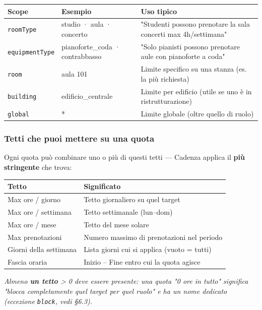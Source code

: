 \documentclass[11pt,a4paper]{article}
\renewenvironment{quote}
  {\begin{list}{}{%
      \setlength{\leftmargin}{8pt}%
      \setlength{\rightmargin}{8pt}%
      \setlength{\topsep}{6pt}%
      \setlength{\parsep}{0pt}}%
      \item\relax\color{black!75}\itshape}
  {\end{list}}
\begin{document}
\begin{table}[H]
\centering
\small
\begin{tabularx}{\linewidth}{|X|X|X|}
\hline
\rowcolor{tableheader} Scope & Esempio & Uso tipico \\
\hline
\texttt{roomType} & studio · aula · concerto & "Studenti possono prenotare la sala concerti max 4h/settimana" \\
\hline
\texttt{equipmentType} & pianoforte\_coda · contrabbasso & "Solo pianisti possono prenotare aule con pianoforte a coda" \\
\hline
\texttt{room} & aula 101 & Limite specifico su una stanza (es. la più richiesta) \\
\hline
\texttt{building} & edificio\_centrale & Limite per edificio (utile se uno è in ristrutturazione) \\
\hline
\texttt{global} & * & Limite globale (oltre quello di ruolo) \\
\hline
\end{tabularx}
\end{table}


\subsubsection{Tetti che puoi mettere su una quota}


Ogni quota può combinare uno o più di questi tetti --- Cadenza applica il \textbf{più stringente} che trova:

\begin{table}[H]
\centering
\small
\begin{tabularx}{\linewidth}{|X|X|}
\hline
\rowcolor{tableheader} Tetto & Significato \\
\hline
Max ore / giorno & Tetto giornaliero su quel target \\
\hline
Max ore / settimana & Tetto settimanale (lun--dom) \\
\hline
Max ore / mese & Tetto del mese solare \\
\hline
Max prenotazioni & Numero massimo di prenotazioni nel periodo \\
\hline
Giorni della settimana & Lista giorni cui si applica (vuoto = tutti) \\
\hline
Fascia oraria & Inizio -- Fine entro cui la quota agisce \\
\hline
\end{tabularx}
\end{table}


\begin{quote}
Almeno \textbf{un tetto} \textgreater{} 0 deve essere presente: una quota "0 ore in tutto" significa "blocca completamente quel target per quel ruolo" e ha un nome dedicato (eccezione \texttt{block}, vedi §6.3).
\end{quote}
\end{document}
